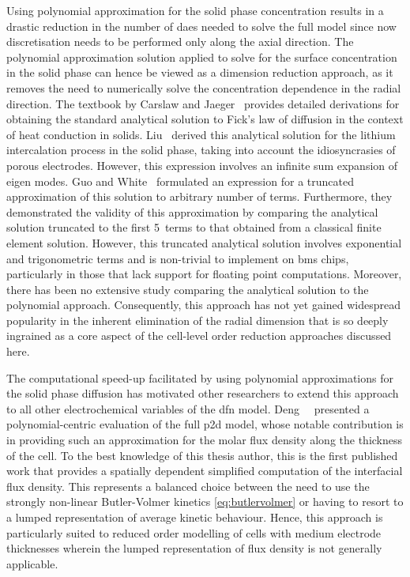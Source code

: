 Using  polynomial  approximation  for  the  solid  phase  concentration  results
in  a  drastic reduction  in  the  number of  \glspl{dae}  needed  to solve  the
full  model since  now  discretisation  needs to  be  performed  only along  the
axial  direction. The  polynomial approximation  solution applied  to solve  for
the  surface  concentration  in  the  solid  phase can  hence  be  viewed  as  a
dimension reduction  approach, as it removes  the need to numerically  solve the
concentration  dependence  in the  radial  direction.  The textbook  by  Carslaw
and Jaeger~\cite{Carslaw1947}  provides detailed  derivations for  obtaining the
standard  analytical  solution  to  Fick's  law  of  diffusion  in  the  context
of  heat  conduction  in  solids.  Liu~\cite{Liu2006}  derived  this  analytical
solution for the  lithium intercalation process in the solid  phase, taking into
account  the  idiosyncrasies  of  porous electrodes.  However,  this  expression
involves an infinite sum expansion  of eigen modes. Guo and White~\cite{Guo2012}
formulated  an expression  for a  truncated  approximation of  this solution  to
arbitrary number of  terms. Furthermore, they demonstrated the  validity of this
approximation  by  comparing the  analytical  solution  truncated to  the  first
5~terms to that obtained from a classical finite element solution. However, this
truncated analytical  solution involves exponential and  trigonometric terms and
is  non-trivial to  implement on  \gls{bms}  chips, particularly  in those  that
lack  support for  floating  point  computations. Moreover,  there  has been  no
extensive study  comparing the analytical  solution to the  polynomial approach.
Consequently,  this approach  has not  yet gained  widespread popularity  in the
inherent elimination  of the radial dimension  that is so deeply  ingrained as a
core aspect of the cell-level order reduction approaches discussed here.

The computational  speed-up facilitated  by using polynomial  approximations for
the  solid  phase diffusion  has  motivated  other  researchers to  extend  this
approach  to  all  other  electrochemical  variables  of  the  \gls{dfn}  model.
Deng~\etal{}~\cite{Deng2018}  presented a  polynomial-centric evaluation  of the
full  \gls{p2d}  model, whose  notable  contribution  is  in providing  such  an
approximation for the molar flux density along the thickness of the cell. To the
best knowledge  of this  thesis author,  this is the  first published  work that
provides a  spatially dependent simplified  computation of the  interfacial flux
density. This represents a balanced choice  between the need to use the strongly
non-linear Butler-Volmer kinetics \cref{eq:butlervolmer} or  having to resort to
a lumped  representation of average  kinetic behaviour. Hence, this  approach is
particularly suited  to reduced order  modelling of cells with  medium electrode
thicknesses wherein the  lumped representation of flux density  is not generally
applicable.

